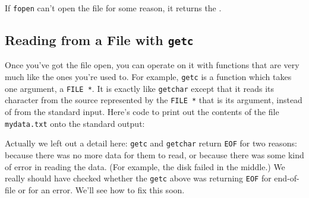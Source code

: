 If {\tt fopen} can't open the file for some reason, it returns the \np.

\subsection{Reading from a File with {\tt getc}}

Once you've got the file open, you can operate on it with functions that
are very much like the ones you're used to.  For example, {\tt getc} is
a function which takes one argument, a {\tt FILE *}.  It is exactly like
{\tt getchar} except that it reads its character from the source
represented by the {\tt FILE *} that is its argument, instead of from
the standard input.  Here's code to print out the contents of the file
{\tt mydata.txt} onto the standard output:


Actually we left out a detail here:  {\tt getc} and {\tt getchar} return
{\tt EOF} for two reasons:  because there was no more data for them to
read, or because there was some kind of error in reading the data.  (For
example, the disk failed in the middle.)  We really should have checked
whether the {\tt getc} above was returning {\tt EOF} for end-of-file or
for an error.  We'll see how to fix this soon.

